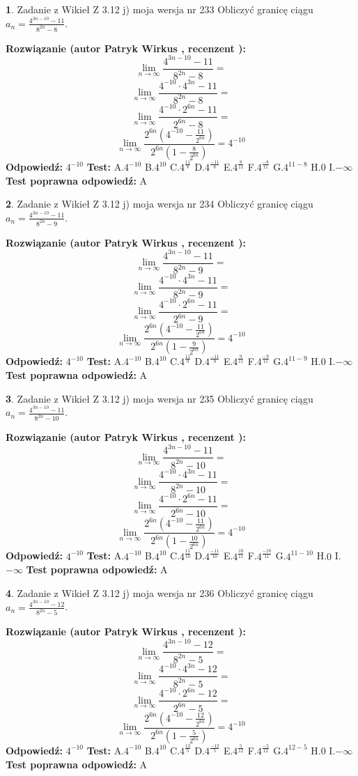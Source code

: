 \documentclass[12pt, a4paper]{article}
\theoremstyle{definition} %
\newtheorem{zad}{}
\newcommand{\zadStart}[1]{\begin{zad}#1\newline}
\newcommand{\zadStop}{\end{zad}}
\newcommand{\rozwStart}[2]{\noindent \textbf{Rozwiązanie (autor #1 , recenzent #2): }\newline}
\newcommand{\rozwStop}{\newline}
\newcommand{\odpStart}{\noindent \textbf{Odpowiedź:}\newline}
\newcommand{\odpStop}{\newline}
\newcommand{\testStart}{\noindent \textbf{Test:}\newline}
\newcommand{\testStop}{\newline}
\newcommand{\kluczStart}{\noindent \textbf{Test poprawna odpowiedź:}\newline}
\newcommand{\kluczStop}{\newline}
\begin{document}
\zadStart{Zadanie z Wikieł Z 3.12 j) moja wersja nr 233}
Obliczyć granicę ciągu $a_{n}=\frac{4^{3n-10}-11}{8^{2n}-8}$.
\zadStop
\rozwStart{Patryk Wirkus}{}
$$\lim\limits_{n\to\infty}\frac{4^{3n-10}-11}{8^{2n}-8}=$$
$$\lim\limits_{n\to\infty}\frac{4^{-10} \cdot 4^{3n}-11}{8^{2n}-8}=$$
$$\lim\limits_{n\to\infty}\frac{4^{-10} \cdot 2^{6n}-11}{2^{6n}-8}=$$
$$\lim\limits_{n\to\infty}\frac{2^{6n}(4^{-10} - \frac{11}{2^{6n}})}{2^{6n}(1-\frac{8}{2^{6n}})}= 4^{-10}$$
\rozwStop
\odpStart
$4^{-10}$
\odpStop
\testStart
A.$4^{-10}$
B.$4^{10}$
C.$4^{\frac{11}{8}}$
D.$4^{\frac{-11}{8}}$
E.$4^{\frac{8}{11}}$
F.$4^{\frac{-8}{11}}$
G.$4^{11-8}$
H.$0$
I.$-\infty$
\testStop
\kluczStart
A
\kluczStop



\zadStart{Zadanie z Wikieł Z 3.12 j) moja wersja nr 234}
Obliczyć granicę ciągu $a_{n}=\frac{4^{3n-10}-11}{8^{2n}-9}$.
\zadStop
\rozwStart{Patryk Wirkus}{}
$$\lim\limits_{n\to\infty}\frac{4^{3n-10}-11}{8^{2n}-9}=$$
$$\lim\limits_{n\to\infty}\frac{4^{-10} \cdot 4^{3n}-11}{8^{2n}-9}=$$
$$\lim\limits_{n\to\infty}\frac{4^{-10} \cdot 2^{6n}-11}{2^{6n}-9}=$$
$$\lim\limits_{n\to\infty}\frac{2^{6n}(4^{-10} - \frac{11}{2^{6n}})}{2^{6n}(1-\frac{9}{2^{6n}})}= 4^{-10}$$
\rozwStop
\odpStart
$4^{-10}$
\odpStop
\testStart
A.$4^{-10}$
B.$4^{10}$
C.$4^{\frac{11}{9}}$
D.$4^{\frac{-11}{9}}$
E.$4^{\frac{9}{11}}$
F.$4^{\frac{-9}{11}}$
G.$4^{11-9}$
H.$0$
I.$-\infty$
\testStop
\kluczStart
A
\kluczStop



\zadStart{Zadanie z Wikieł Z 3.12 j) moja wersja nr 235}
Obliczyć granicę ciągu $a_{n}=\frac{4^{3n-10}-11}{8^{2n}-10}$.
\zadStop
\rozwStart{Patryk Wirkus}{}
$$\lim\limits_{n\to\infty}\frac{4^{3n-10}-11}{8^{2n}-10}=$$
$$\lim\limits_{n\to\infty}\frac{4^{-10} \cdot 4^{3n}-11}{8^{2n}-10}=$$
$$\lim\limits_{n\to\infty}\frac{4^{-10} \cdot 2^{6n}-11}{2^{6n}-10}=$$
$$\lim\limits_{n\to\infty}\frac{2^{6n}(4^{-10} - \frac{11}{2^{6n}})}{2^{6n}(1-\frac{10}{2^{6n}})}= 4^{-10}$$
\rozwStop
\odpStart
$4^{-10}$
\odpStop
\testStart
A.$4^{-10}$
B.$4^{10}$
C.$4^{\frac{11}{10}}$
D.$4^{\frac{-11}{10}}$
E.$4^{\frac{10}{11}}$
F.$4^{\frac{-10}{11}}$
G.$4^{11-10}$
H.$0$
I.$-\infty$
\testStop
\kluczStart
A
\kluczStop



\zadStart{Zadanie z Wikieł Z 3.12 j) moja wersja nr 236}
Obliczyć granicę ciągu $a_{n}=\frac{4^{3n-10}-12}{8^{2n}-5}$.
\zadStop
\rozwStart{Patryk Wirkus}{}
$$\lim\limits_{n\to\infty}\frac{4^{3n-10}-12}{8^{2n}-5}=$$
$$\lim\limits_{n\to\infty}\frac{4^{-10} \cdot 4^{3n}-12}{8^{2n}-5}=$$
$$\lim\limits_{n\to\infty}\frac{4^{-10} \cdot 2^{6n}-12}{2^{6n}-5}=$$
$$\lim\limits_{n\to\infty}\frac{2^{6n}(4^{-10} - \frac{12}{2^{6n}})}{2^{6n}(1-\frac{5}{2^{6n}})}= 4^{-10}$$
\rozwStop
\odpStart
$4^{-10}$
\odpStop
\testStart
A.$4^{-10}$
B.$4^{10}$
C.$4^{\frac{12}{5}}$
D.$4^{\frac{-12}{5}}$
E.$4^{\frac{5}{12}}$
F.$4^{\frac{-5}{12}}$
G.$4^{12-5}$
H.$0$
I.$-\infty$
\testStop
\kluczStart
A
\kluczStop
\end{document}
